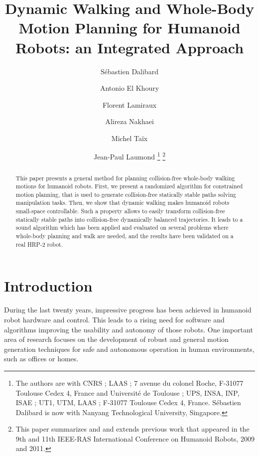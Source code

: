 \documentclass{article}
\begin{document}
\title{Dynamic Walking and Whole-Body Motion Planning for Humanoid Robots: an Integrated Approach}

\author{
  S\'ebastien Dalibard\and
  Antonio El Khoury\and
  Florent Lamiraux\and
  Alireza Nakhaei\and
  Michel Ta\"ix\and
  Jean-Paul Laumond
  \footnote{The authors are with CNRS ; LAAS ; 7 avenue du colonel Roche, F-31077
    Toulouse Cedex 4, France and Universit\'e de Toulouse ; UPS, INSA, INP, ISAE ;
    UT1, UTM, LAAS ; F-31077 Toulouse
    Cedex 4, France. S\'ebastien Dalibard is now with Nanyang Technological University, Singapore.}
  \footnote{
    This paper summarizes and and extends previous work that appeared in the 9th and 11th
    IEEE-RAS International Conference on Humanoid Robots, 2009 and 2011.
  }
}

\date{}

\maketitle

\begin{abstract}

This paper presents a general method for planning collision-free whole-body walking motions
for humanoid robots. First, we present a randomized algorithm for constrained motion
planning, that is used to generate collision-free statically stable paths solving
manipulation tasks. Then, we show that dynamic walking makes humanoid robots 
small-space controllable. Such a property allows to easily transform 
collision-free statically stable paths into 
collision-free dynamically balanced trajectories. It leads to a sound 
algorithm which has been applied and evaluated on several
problems where whole-body planning and  walk are needed,
and the results have been validated  on a real HRP-2 robot.

\end{abstract}

\section{Introduction}

During the last twenty years, impressive progress has been achieved in humanoid
robot hardware and control. This leads to a rising need for software and algorithms
improving the usability and autonomy of those robots. One important area of research
focuses on the development of robust and general motion generation techniques for safe
and autonomous operation in human environments, such as offices or homes.
\end{document}
